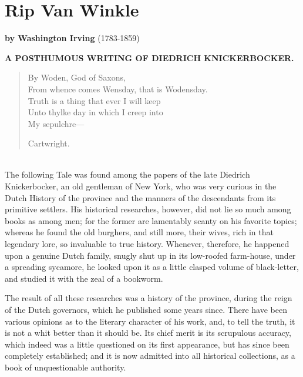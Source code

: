 \chapter{Rip Van Winkle}
\textbf{by Washington Irving} (1783-1859)\\

\begin{flushleft}
	\noindent\large\textbf{A POSTHUMOUS WRITING OF DIEDRICH KNICKERBOCKER.\\}
\end{flushleft}

\large
\begin{quotation}
	\noindent
	\begin{flushleft}
		By Woden, God of Saxons,\\
		From whence comes Wensday, that is Wodensday.\\
		Truth is a thing that ever I will keep\\
		Unto thylke day in which I creep into\\
		My sepulchre—\\
	\end{flushleft}
	\begin{flushright}
		Cartwright.
	\end{flushright}
\end{quotation}

\Large

\noindent\\
The following Tale was found among the papers of the late Diedrich Knickerbocker, an old gentleman of New York, who was very curious in the Dutch History of the province and the manners of the descendants from its primitive settlers. His historical researches, however, did not lie so much among books as among men; for the former are lamentably scanty on his favorite topics; whereas he found the old burghers, and still more, their wives, rich in that legendary lore, so invaluable to true history. Whenever, therefore, he happened upon a genuine Dutch family, snugly shut up in its low-roofed farm-house, under a spreading sycamore, he looked upon it as a little clasped volume of black-letter, and studied it with the zeal of a bookworm.

The result of all these researches was a history of the province, during the reign of the Dutch governors, which he published some years since. There have been various opinions as to the literary character of his work, and, to tell the truth, it is not a whit better than it should be. Its chief merit is its scrupulous accuracy, which indeed was a little questioned on its first appearance, but has since been completely established; and it is now admitted into all historical collections, as a book of unquestionable authority.

